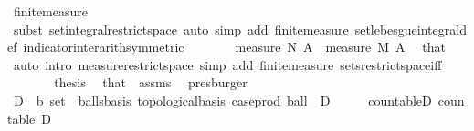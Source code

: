\begin{isabellebody}
\ finite{\isacharunderscore}{\kern0pt}measure\ \isamarkupfalse%
\ {\isacharparenleft}{\kern0pt}subst\ set{\isacharunderscore}{\kern0pt}integral{\isacharunderscore}{\kern0pt}restrict{\isacharunderscore}{\kern0pt}space{\isacharcomma}{\kern0pt}\ auto\ simp\ add{\isacharcolon}{\kern0pt}\ finite{\isacharunderscore}{\kern0pt}measure\ set{\isacharunderscore}{\kern0pt}lebesgue{\isacharunderscore}{\kern0pt}integral{\isacharunderscore}{\kern0pt}def\ indicator{\isacharunderscore}{\kern0pt}inter{\isacharunderscore}{\kern0pt}arith{\isacharbrackleft}{\kern0pt}symmetric{\isacharbrackright}{\kern0pt}{\isacharparenright}{\kern0pt}\isanewline
\ \ \ \ \isamarkupfalse%
\ \isamarkupfalse%
\ {\isachardoublequoteopen}measure\ N\ A\ {\isacharequal}{\kern0pt}\ measure\ M\ A{\isachardoublequoteclose}\ \isamarkupfalse%
\ that\ \isamarkupfalse%
\ {\isacharparenleft}{\kern0pt}auto\ intro{\isacharbang}{\kern0pt}{\isacharcolon}{\kern0pt}\ measure{\isacharunderscore}{\kern0pt}restrict{\isacharunderscore}{\kern0pt}space\ simp\ add{\isacharcolon}{\kern0pt}\ finite{\isacharunderscore}{\kern0pt}measure\ sets{\isacharunderscore}{\kern0pt}restrict{\isacharunderscore}{\kern0pt}space{\isacharunderscore}{\kern0pt}iff{\isacharparenright}{\kern0pt}\isanewline
\ \ \ \ \isamarkupfalse%
\ \isamarkupfalse%
\ {\isacharquery}{\kern0pt}thesis\ \isamarkupfalse%
\ that\ {\isacharasterisk}{\kern0pt}\ assms{\isacharparenleft}{\kern0pt}{}{\isacharparenright}{\kern0pt}\ \isamarkupfalse%
\ presburger\isanewline
\ \ \isamarkupfalse%
\isanewline
\isanewline
\ \ \isamarkupfalse%
\ D\ {\isacharcolon}{\kern0pt}{\isacharcolon}{\kern0pt}\ {\isachardoublequoteopen}{\isacharprime}{\kern0pt}b\ set{\isachardoublequoteclose}\ \ balls{\isacharunderscore}{\kern0pt}basis{\isacharcolon}{\kern0pt}\ {\isachardoublequoteopen}topological{\isacharunderscore}{\kern0pt}basis\ {\isacharparenleft}{\kern0pt}case{\isacharunderscore}{\kern0pt}prod\ ball\ {\isacharbackquote}{\kern0pt}\ {\isacharparenleft}{\kern0pt}D\ {\isasymtimes}\ {\isacharparenleft}{\kern0pt}{\isasymrat}\ {\isasyminter}\ {\isacharbraceleft}{\kern0pt}{}{\isacharless}{\kern0pt}{\isachardot}{\kern0pt}{\isachardot}{\kern0pt}{\isacharbraceright}{\kern0pt}{\isacharparenright}{\kern0pt}{\isacharparenright}{\kern0pt}{\isacharparenright}{\kern0pt}{\isachardoublequoteclose}\ \ countable{\isacharunderscore}{\kern0pt}D{\isacharcolon}{\kern0pt}\ {\isachardoublequoteopen}countable\ D{\isachardoublequoteclose}\ \isamarkupfalse%

\end{isabellebody}

